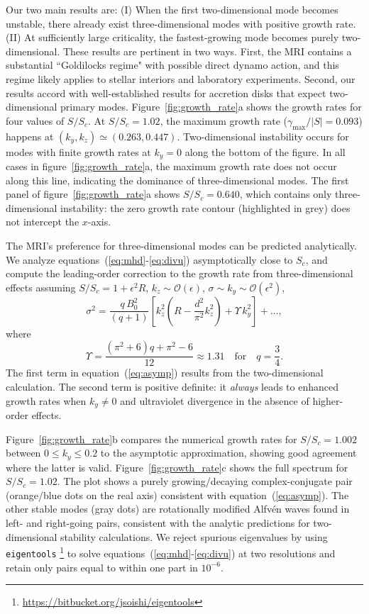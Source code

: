 \documentclass[aps,prl,reprint,superscriptaddress]{revtex4-1}
\newcommand{\SSC}{S/S_{c}}
\begin{document}
Our two main results are: 
(I) When the first two-dimensional mode becomes unstable, there already exist three-dimensional modes with positive growth rate. 
(II) At sufficiently large criticality, the fastest-growing mode becomes purely two-dimensional. 
These results are pertinent in two ways. 
First, the MRI contains a substantial ``Goldilocks regime" with possible direct dynamo action, and this regime likely applies to stellar interiors and laboratory experiments. 
Second, our results accord with well-established results for accretion disks that expect two-dimensional primary modes.
Figure~\ref{fig:growth_rate}a shows the growth rates for four values of $\SSC$. 
At $\SSC=1.02$, the maximum growth rate ($\gamma_{\max}/|S|=0.093$) happens at $(k_{y},k_{z})\simeq(0.263,0.447)$.
Two-dimensional instability occurs for modes with finite growth rates at $k_y = 0$ along the bottom of the figure.
In all cases in figure~\ref{fig:growth_rate}a, the maximum growth rate does not occur along this line, indicating the dominance of three-dimensional modes.
The first panel of figure~\ref{fig:growth_rate}a shows $\SSC=0.640$, which contains only three-dimensional instability: the zero growth rate contour (highlighted in grey) does not intercept the $x$-axis.

The MRI's preference for three-dimensional modes can be predicted analytically.
We analyze equations~(\ref{eq:mhd}-\ref{eq:divu}) asymptotically close to $S_{c}$, and compute the leading-order correction to the growth rate from three-dimensional effects assuming $\SSC=1+\epsilon^{2}R$, $k_{z}\sim\mathcal{O}(\epsilon)$, $\sigma\sim{k_{y}}\sim\mathcal{O}(\epsilon^{2})$, 
\begin{equation}\label{eq:asymp}
\sigma^{2}=\frac{q\,B_{0}^{2}}{(q+1)}\left[ k_{z}^{2}\left(R-\frac{d^2}{\pi^{2}}k_{z}^{2}\right)+\Upsilon\,k_{y}^{2}\right]+\ldots,
\end{equation}
where
\begin{equation}
\Upsilon=\frac{\left(\pi^{2}+6\right) q+\pi^{2}-6}{12}\approx1.31\quad\text{for}\quad{q}=\frac{3}{4}.
\end{equation}
The first term in equation~(\ref{eq:asymp}) results from the two-dimensional calculation.
The second term is positive definite: it \emph{always} leads to enhanced growth rates when $k_{y}\neq0$ and ultraviolet divergence in the absence of higher-order effects.

Figure~\ref{fig:growth_rate}b compares the numerical growth rates for $\SSC=1.002$ between $0\le{k_{y}}\le0.2$ to the asymptotic approximation, showing good agreement where the latter is valid.
Figure~\ref{fig:growth_rate}c shows the full spectrum for $\SSC=1.02$.
The plot shows a purely growing/decaying complex-conjugate pair (orange/blue dots on the real axis) consistent with equation~(\ref{eq:asymp}).
The other stable modes (gray dots) are rotationally modified Alfv\'{e}n waves found in left- and right-going pairs, consistent with the analytic predictions for two-dimensional stability calculations.
We reject spurious eigenvalues by using \texttt{eigentools} \footnote{\protect\url{https://bitbucket.org/jsoishi/eigentools}} to solve equations~(\ref{eq:mhd}-\ref{eq:divu}) at two resolutions and retain only pairs equal to within one part in $10^{-6}$.
\end{document}

